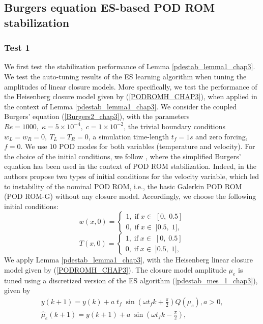 \documentclass[letterpaper,conference,onecolumn,11pt]{IEEEtran}
\begin{document}
\subsection{Burgers equation
ES-based POD ROM stabilization} \subsubsection{Test 1} We first
test the stabilization performance of Lemma
\ref{pdestab_lemma1_chap3}. We test the auto-tuning results of the
ES learning algorithm when tuning the amplitudes of linear closure
models. More specifically, we test the performance of the
Heisenberg closure model given by (\ref{PODROMH_CHAP3}), when
applied in the context of Lemma \ref{pdestab_lemma1_chap3}.
 We consider the coupled Burgers'
equation (\ref{Burgers2_chap3}), with the parameters
$Re=1000,\;\kappa=5\times 10^{-4},\;c=1\times 10^{-2}$,  the
trivial boundary conditions $w_L=w_R=0, \ T_L=T_R=0$, a simulation
time-length $t_{f}=1s$ and zero forcing,  $f =0$. We use $10$ POD
modes for both variables (temperature and velocity). For the
choice of the initial conditions, we follow \cite{SI13}, where the
simplified Burgers' equation has been used in the context of POD
ROM stabilization. Indeed, in \cite{SI13} the authors propose two
types of initial conditions for the velocity variable, which led
to instability of the nominal POD ROM, i.e., the basic Galerkin
POD ROM (POD ROM-G) without any closure model. Accordingly, we
choose the following initial conditions:
\begin{equation}\label{vinitial_cond_burgers_stab_test1}
w(x,0)= \left\{
\begin{array}{l}
1,\;\text{if}\;x\in\;[0,\;0.5]\\
0,\;\text{if}\;x\in\;]0.5,\;1],
\end{array}
\right.
\end{equation}
\begin{equation}\label{Tinitial_cond_burgers_stab_test1}
T(x,0)= \left\{
\begin{array}{l}
1,\;\text {if}\;x\in\;[0,\;0.5]\\
0,\;\text {if}\;x\in\;]0.5,\;1],
\end{array}
\right.
\end{equation}
We apply Lemma \ref{pdestab_lemma1_chap3}, with the Heisenberg
linear closure model given by (\ref{PODROMH_CHAP3}). The closure
model amplitude $\mu_{e}$ is tuned using a discretized version of
the ES algorithm (\ref{pdestab_mes_1_chap3}), given by
\begin{equation}
\begin{array}{l}
y(k+1)=y(k)+a\;t_{f}\;\sin(\omega t_{f}k+\frac{\pi}{2})Q(\hat\mu_{e}), a>0,\\
\hat{\mu}_{e}(k+1)=y(k+1)+a\;\sin(\omega t_{f}k-\frac{\pi}{2}),
\label{pdestab_mes_1discrt_chap3}
\end{array}
\end{equation}
\end{document}
